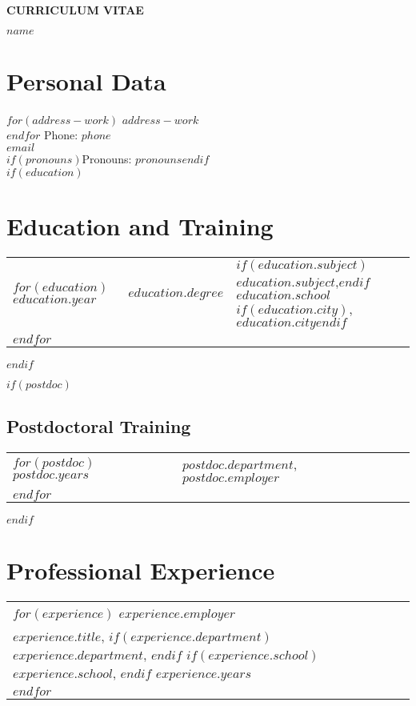 \documentclass[12pt, martgin, line]{article}
\begin{document}

\begin{center}
  \textbf{CURRICULUM VITAE}

  \textbf{$name$}
\end{center}

\section*{Personal Data}

$for(address-work)$
$address-work$\\
$endfor$
Phone: $phone$\\
\href{mailto:$email$}{$email$}\\
$if(pronouns)$Pronouns: $pronouns$$endif$\\


$if(education)$
\section*{Education and Training}
\noindent
\begin{tabular}{lll}
$for(education)$
$education.year$&$education.degree$&
$if(education.subject)$$education.subject$,$endif$
$education.school$$if(education.city)$, $education.city$$endif$\\
$endfor$
\end{tabular}
$endif$

$if(postdoc)$
\subsection*{Postdoctoral Training}
\noindent
\begin{tabular}{lll}
$for(postdoc)$
$postdoc.years$&
$postdoc.department$, $postdoc.employer$\\
$endfor$
\end{tabular}
$endif$

\section*{Professional Experience}
\noindent
\begin{tabular}{lll}
$for(experience)$
\textbf{$experience.employer$}\\
$experience.title$, 
$if(experience.department)$$experience.department$, $endif$
$if(experience.school)$$experience.school$, $endif$
$experience.years$\\
$endfor$
\end{tabular}
\end{document}
